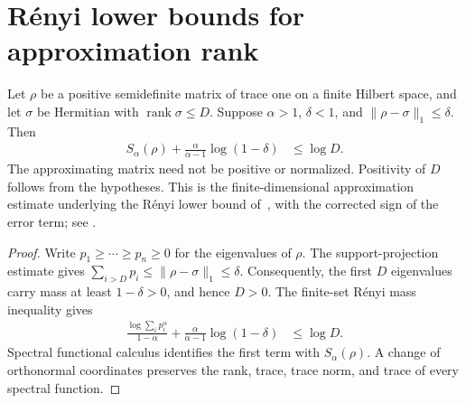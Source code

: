 \section{Rényi lower bounds for approximation rank}
\label{sec:renyi_rank_lower_bound}

\begin{theorem}
  \label{thm:renyi_rank_lower_bound}
  \leanok
  Let $\rho$ be a positive semidefinite matrix of trace one on a finite
  Hilbert space, and let $\sigma$ be Hermitian with
  $\operatorname{rank}\sigma\le D$. Suppose $\alpha>1$, $\delta<1$, and
  $\lVert\rho-\sigma\rVert_1\le\delta$. Then
  \begin{align}
    \label{eq:renyi_approximation_rank_lower_bound}
    S_\alpha(\rho)+\frac{\alpha}{\alpha-1}\log(1-\delta)
      &\le\log D.
  \end{align}
  The approximating matrix need not be positive or normalized. Positivity
  of $D$ follows from the hypotheses. This is the finite-dimensional
  approximation estimate underlying the Rényi lower bound
  of~\cite{Schuch2008EntropyScaling}, with the corrected sign of the error term; see
  \cite{gap:swvc08_renyi_bond_dimension_sign}.
\end{theorem}

\begin{proof}\leanok
  Write $p_1\ge\cdots\ge p_n\ge0$ for the eigenvalues of $\rho$.
  The support-projection estimate gives
  $\sum_{i>D}p_i\le\lVert\rho-\sigma\rVert_1\le\delta$.
  Consequently, the first $D$ eigenvalues carry mass at least $1-\delta>0$,
  and hence $D>0$. The finite-set Rényi mass inequality gives
  \begin{align}
    \label{eq:renyi_approximation_rank_spectral_sum}
    \frac{\log\sum_i p_i^\alpha}{1-\alpha}
      +\frac{\alpha}{\alpha-1}\log(1-\delta)&\le\log D.
  \end{align}
  Spectral functional calculus identifies the first term with
  $S_\alpha(\rho)$. A change of orthonormal coordinates preserves the
  rank, trace, trace norm, and trace of every spectral function.
\end{proof}


